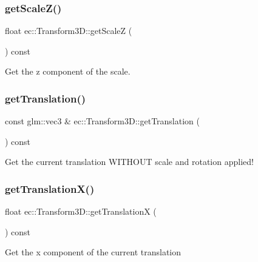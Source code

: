 \subsubsection{\texorpdfstring{get\+Scale\+Z()}{getScaleZ()}}
{\footnotesize\ttfamily float ec\+::\+Transform3\+D\+::get\+ScaleZ (\begin{DoxyParamCaption}{ }\end{DoxyParamCaption}) const}

Get the z component of the scale. \mbox{\label{classec_1_1_transform3_d_a73b5f3bfbeb73eb4f445b1941b8e359d}} 
\subsubsection{\texorpdfstring{get\+Translation()}{getTranslation()}}
{\footnotesize\ttfamily const glm\+::vec3 \& ec\+::\+Transform3\+D\+::get\+Translation (\begin{DoxyParamCaption}{ }\end{DoxyParamCaption}) const}



Get the current translation W\+I\+T\+H\+O\+UT scale and rotation applied! 

\mbox{\label{classec_1_1_transform3_d_ac0371b75ed67d59665967846d9cc6827}} 
\subsubsection{\texorpdfstring{get\+Translation\+X()}{getTranslationX()}}
{\footnotesize\ttfamily float ec\+::\+Transform3\+D\+::get\+TranslationX (\begin{DoxyParamCaption}{ }\end{DoxyParamCaption}) const}

Get the x component of the current translation \mbox{\label{classec_1_1_transform3_d_a18d2aca82a3b8944815801963f32ab8c}} 
